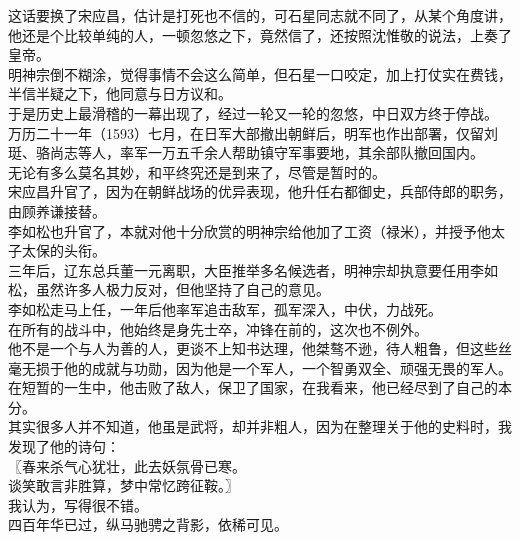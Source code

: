 \begin{multicols}{\theparacolNo}
这话要换了宋应昌，估计是打死也不信的，可石星同志就不同了，从某个角度讲，他还是个比较单纯的人，一顿忽悠之下，竟然信了，还按照沈惟敬的说法，上奏了皇帝。\\

明神宗倒不糊涂，觉得事情不会这么简单，但石星一口咬定，加上打仗实在费钱，半信半疑之下，他同意与日方议和。\\

于是历史上最滑稽的一幕出现了，经过一轮又一轮的忽悠，中日双方终于停战。\\

万历二十一年（1593）七月，在日军大部撤出朝鲜后，明军也作出部署，仅留刘珽、骆尚志等人，率军一万五千余人帮助镇守军事要地，其余部队撤回国内。\\

无论有多么莫名其妙，和平终究还是到来了，尽管是暂时的。\\

宋应昌升官了，因为在朝鲜战场的优异表现，他升任右都御史，兵部侍郎的职务，由顾养谦接替。\\

李如松也升官了，本就对他十分欣赏的明神宗给他加了工资（禄米），并授予他太子太保的头衔。\\

三年后，辽东总兵董一元离职，大臣推举多名候选者，明神宗却执意要任用李如松，虽然许多人极力反对，但他坚持了自己的意见。\\

李如松走马上任，一年后他率军追击敌军，孤军深入，中伏，力战死。\\

在所有的战斗中，他始终是身先士卒，冲锋在前的，这次也不例外。\\

他不是一个与人为善的人，更谈不上知书达理，他桀骜不逊，待人粗鲁，但这些丝毫无损于他的成就与功勋，因为他是一个军人，一个智勇双全、顽强无畏的军人。在短暂的一生中，他击败了敌人，保卫了国家，在我看来，他已经尽到了自己的本分。\\

其实很多人并不知道，他虽是武将，却并非粗人，因为在整理关于他的史料时，我发现了他的诗句：\\

〖春来杀气心犹壮，此去妖氛骨已寒。\\

谈笑敢言非胜算，梦中常忆跨征鞍。〗\\

我认为，写得很不错。\\

四百年华已过，纵马驰骋之背影，依稀可见。\\
\ifnum{}
	\end{multicols}
\fi
\newpage

